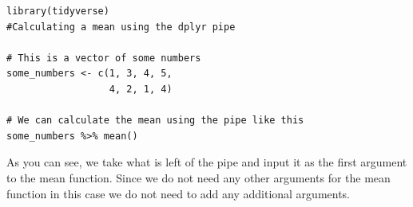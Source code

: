 \documentclass[
]{book}
\begin{document}
\begin{verbatim}
library(tidyverse)
#Calculating a mean using the dplyr pipe

# This is a vector of some numbers
some_numbers <- c(1, 3, 4, 5,
                  4, 2, 1, 4)

# We can calculate the mean using the pipe like this
some_numbers %>% mean()
\end{verbatim}

As you can see, we take what is left of the pipe and input it as the first argument to the mean function. Since we do not need any other arguments for the mean function in this case we do not need to add any additional arguments.

\hypertarget{the-magrittr-exposition-pipe-the-most-commonly-used-pipe-in-tidyverse-is-the-dplyr-pipe-i.e.-.-there-is-however-another-useful-pipe-which-deserves-a-mention-it-is-the-magrittr-pipe-.-themagrittrpipe-is-useful-when-we-have-functions-which-require-as-inputs-variables-from-a-data-set.-for-instance-if-we-want-to-run-a-correlation-analysis-on-two-variables-in-a-data-set-we-would-ordinarily-have-to-write-the-name-of-the-data-setand-the-name-of-the-variable.-the-magrittr-pipe-simplifies-this-by-exposing-the-variables-in-the-dataset-on-the-left-hand-side-of-the-pipe-so-that-these-variables-can-be-accessed-directly-by-their-names-in-a-function.-for-instance-let-us-work-with-thedistrictsdata-set-from-the-previous-chapters-to-look-at-the-correlation-betweenvote_share_per_districtandvoters_per_district.-you-can-create-thedistricts-data-set-by-running}{%
}
\end{document}
